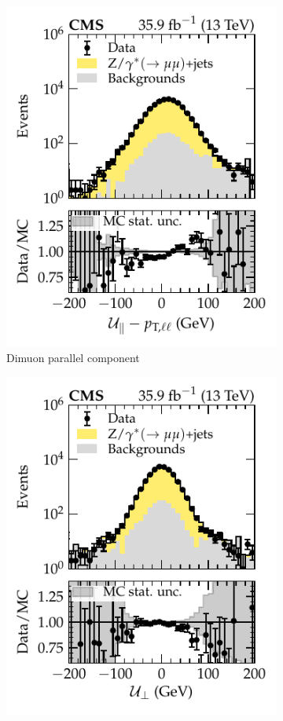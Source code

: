 \begin{figure}[htb]
    \centering
    \begin{subfigure}[b]{0.49\textwidth}
        \centering
        \includegraphics{chapters/041_corrections/images/ptmiss_calib/metres_para_mm_incdist.pdf}
        \caption{Dimuon parallel component}
        \label{subfiga:recoil-calib-dists}
    \end{subfigure}
    \hfill
    \begin{subfigure}[b]{0.49\textwidth}
        \centering
        \includegraphics{chapters/041_corrections/images/ptmiss_calib/metres_perp_mm_incdist.pdf}

\end{subfigure}
\end{figure}
